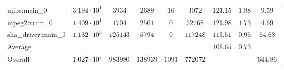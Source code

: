 \begin{tabular}{|l|c|c|c|c|c|c|c|c|}
mips:main\_0            & $ 3.194 \cdot 10^{1} $ & $ 3934   $ & $ 2689   $ & $ 16   $ & $ 3072   $ & $ 123.15      $ & $ 1.88    $ & $ 9.59    $ \\
mpeg2:main\_0           & $ 1.409 \cdot 10^{1} $ & $ 1704   $ & $ 2501   $ & $ 0    $ & $ 32768  $ & $ 120.98      $ & $ 1.73    $ & $ 4.69    $ \\
sha\_driver:main\_0     & $ 1.132 \cdot 10^{3} $ & $ 125143 $ & $ 5794   $ & $ 0    $ & $ 117248 $ & $ 110.51      $ & $ 0.95    $ & $ 64.68   $ \\
\hline
Average                 & $                    $ & $        $ & $        $ & $      $ & $        $ & $ 108.65      $ & $ 0.73    $ & $         $ \\
\hline
Overall                 & $ 1.027 \cdot 10^{4} $ & $ 983980 $ & $ 138939 $ & $ 1091 $ & $ 772072 $ & $             $ & $         $ & $ 644.86  $ \\
\hline
\end{tabular}
